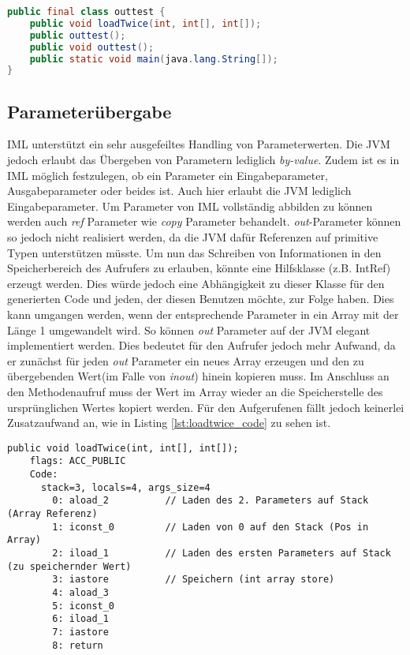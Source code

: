\begin{lstlisting}[caption=Struktur der erzeugten Java-Klasse,language=Java,label={lst:outtest_class}]
public final class outtest {
    public void loadTwice(int, int[], int[]);
    public outtest();
    public void outtest();
    public static void main(java.lang.String[]);
}
\end{lstlisting}


\subsection {Parameterübergabe}

IML unterstützt ein sehr ausgefeiltes Handling von Parameterwerten. Die JVM jedoch erlaubt 
das Übergeben von Parametern lediglich \textit{by-value}. Zudem ist es in IML möglich 
festzulegen, ob ein Parameter ein Eingabeparameter, Ausgabeparameter oder beides ist. Auch hier 
erlaubt die JVM lediglich Eingabeparameter. Um Parameter von IML vollständig abbilden zu können 
werden auch \textit{ref} Parameter wie \textit{copy} Parameter behandelt. \textit{out}-Parameter 
können so jedoch nicht realisiert werden, da die JVM dafür Referenzen auf primitive Typen 
unterstützen müsste. Um nun das Schreiben von Informationen in den Speicherbereich des Aufrufers
zu erlauben, könnte eine Hilfsklasse (z.B. IntRef) erzeugt werden. Dies würde jedoch eine 
Abhängigkeit zu dieser Klasse für den generierten Code und jeden, der diesen Benutzen möchte, 
zur Folge haben. Dies kann umgangen werden, wenn der entsprechende Parameter in ein Array mit
der Länge 1 umgewandelt wird. So können \textit{out} Parameter auf der JVM elegant implementiert werden.
Dies bedeutet für den Aufrufer jedoch mehr Aufwand, da er zunächst für jeden \textit{out} Parameter 
ein neues Array erzeugen und den zu übergebenden Wert(im Falle von \textit{inout}) hinein kopieren muss. 
Im Anschluss an den Methodenaufruf muss der Wert im Array wieder an die Speicherstelle des ursprünglichen 
Wertes kopiert werden. Für den Aufgerufenen fällt jedoch keinerlei Zusatzaufwand an, wie in Listing 
\ref{lst:loadtwice_code} zu sehen ist.
\newline
\begin{lstlisting}[caption=Bytecode der loadTwice Prozedur ohne conditions,label={lst:loadtwice_code}]
public void loadTwice(int, int[], int[]);
    flags: ACC_PUBLIC
    Code:
      stack=3, locals=4, args_size=4
        0: aload_2          // Laden des 2. Parameters auf Stack (Array Referenz)
        1: iconst_0         // Laden von 0 auf den Stack (Pos in Array)
        2: iload_1          // Laden des ersten Parameters auf Stack (zu speichernder Wert)
        3: iastore          // Speichern (int array store)
        4: aload_3       
        5: iconst_0      
        6: iload_1       
        7: iastore       
        8: return
\end{lstlisting}

